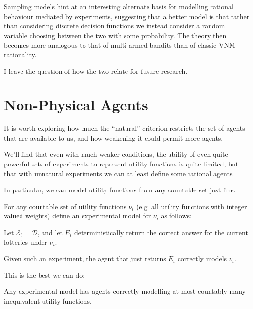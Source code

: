 Sampling models hint at an interesting alternate basis for modelling
rational behaviour mediated by experiments, suggesting that a better
model is that rather than considering discrete decision functions
we instead consider a random variable choosing between the two with
some probability. The theory then becomes more analogous to that
of multi-armed bandits than of classic VNM rationality.

I leave the question of how the two relate for future research.

\section{Non-Physical Agents}
It is worth exploring how much the ``natural'' criterion restricts the
set of agents that are available to us, and how weakening it could
permit more agents.

We'll find that even with much weaker conditions,  the ability of even
quite powerful sets of experiments to represent utility functions is quite limited,
but that with unnatural experiments we can at least define some rational agents.

In particular, we can model utility functions from any countable set just fine:

\begin{example}
For any countable set of utility functions \(\nu_i\) (e.g. all utility functions
with integer valued weights) define an experimental model for $\nu_i$
as follows:

Let \(\mathcal{E}_i = \mathcal{D}\), and let $E_i$ deterministically return the
correct answer for the current lotteries under $\nu_i$.

Given such an experiment, the agent that just returns $E_i$ correctly models $\nu_i$.
\end{example}

This is the best we can do:

\begin{theorem}
Any experimental model has agents correctly modelling at most countably
many inequivalent utility functions. 
\end{theorem}

